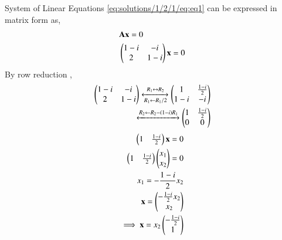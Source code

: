System of Linear Equations \eqref{eq:solutions/1/2/1/eq:eq1} can be expressed in matrix form as,
\begin{align}
    &\mathbf{A}\mathbf{x}=0\\
    &\begin{pmatrix}1-i&-i\\2&1-i\end{pmatrix}\mathbf{x}=0
\end{align}
By row reduction , 
\begin{align}
     \begin{pmatrix}1-i & -i \\ 2 & 1-i\end{pmatrix}
  \xleftrightarrow[R_1\leftarrow R_1/2]{R_1\leftrightarrow R_2}
     \begin{pmatrix}1 & \frac{1-i}{2} \\ 1-i & -i\end{pmatrix}\\
 \xleftrightarrow{R_2\leftarrow R_2-\ensuremath{\left(1-i\right)}R_1}
    \begin{pmatrix}1 & \frac{1-i}{2} \\ 0& 0\end{pmatrix}
    \label{eq:solutions/1/2/1/eq:eqn2}
\end{align} 
\begin{align}
    \begin{pmatrix}1 & \frac{1-i}{2}\end{pmatrix}\mathbf{x}=0\\
    \begin{pmatrix}1 & \frac{1-i}{2}\end{pmatrix}\begin{pmatrix}x_1 \\ x_2\end{pmatrix} =0\\
    x_1= -\frac{1-i}{2}x_2\\
    \mathbf{x}= \begin{pmatrix}-\frac{1-i}{2}x_2 \\ x_2\end{pmatrix}\\
    \implies\mathbf{x}= x_2\begin{pmatrix}-\frac{1-i}{2} \\ 1\end{pmatrix}
\end{align}
